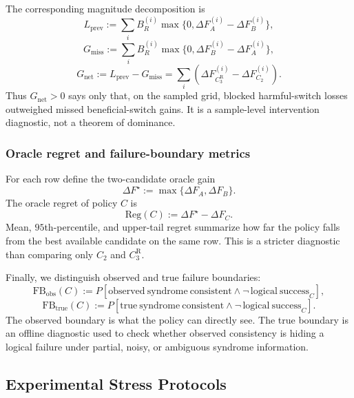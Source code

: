 \documentclass[11pt,a4paper]{article}
\theoremstyle{definition}
\theoremstyle{remark}
\begin{document}
The corresponding magnitude decomposition is
\[
L_{\mathrm{prev}}
:=
\sum_i B_R^{(i)}
\max\{0,\Delta F_A^{(i)}-\Delta F_B^{(i)}\},
\]
\[
G_{\mathrm{miss}}
:=
\sum_i B_R^{(i)}
\max\{0,\Delta F_B^{(i)}-\Delta F_A^{(i)}\},
\]
\[
G_{\mathrm{net}}
:=
L_{\mathrm{prev}}-G_{\mathrm{miss}}
=
\sum_i\left(
\Delta F_{C_3^{\mathrm{R}}}^{(i)}
-
\Delta F_{C_2}^{(i)}
\right).
\]
Thus $G_{\mathrm{net}}>0$ says only that, on the sampled grid, blocked harmful-switch
losses outweighed missed beneficial-switch gains.  It is a sample-level intervention
diagnostic, not a theorem of dominance.

\subsubsection*{Oracle regret and failure-boundary metrics}

For each row define the two-candidate oracle gain
\[
\Delta F^\star
:=
\max\{\Delta F_A,\Delta F_B\}.
\]
The oracle regret of policy $C$ is
\[
\mathrm{Reg}(C)
:=
\Delta F^\star-\Delta F_C.
\]
Mean, $95$th-percentile, and upper-tail regret summarize how far the policy falls
from the best available candidate on the same row.  This is a stricter diagnostic
than comparing only $C_2$ and $C_3^{\mathrm{R}}$.

Finally, we distinguish observed and true failure boundaries:
\[
\mathrm{FB}_{\mathrm{obs}}(C)
:=
P\!\left[
\mathrm{observed\ syndrome\ consistent}
\wedge
\neg\,\mathrm{logical\ success}_C
\right],
\]
\[
\mathrm{FB}_{\mathrm{true}}(C)
:=
P\!\left[
\mathrm{true\ syndrome\ consistent}
\wedge
\neg\,\mathrm{logical\ success}_C
\right].
\]
The observed boundary is what the policy can directly see.  The true boundary is an
offline diagnostic used to check whether observed consistency is hiding a logical
failure under partial, noisy, or ambiguous syndrome information.

\subsection{Experimental Stress Protocols}
\end{document}
